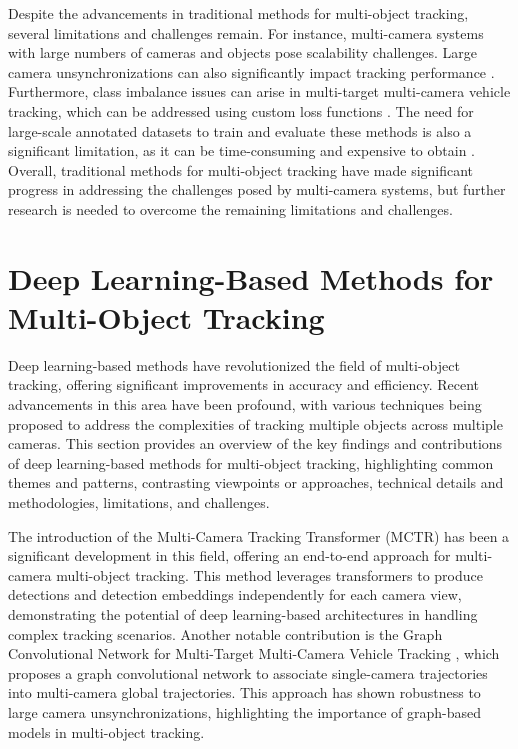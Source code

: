 \documentclass[conference]{IEEEtran}
\begin{document}
Despite the advancements in traditional methods for multi-object tracking, several limitations and challenges remain. For instance, multi-camera systems with large numbers of cameras and objects pose scalability challenges. Large camera unsynchronizations can also significantly impact tracking performance \cite{Title of paper 4}. Furthermore, class imbalance issues can arise in multi-target multi-camera vehicle tracking, which can be addressed using custom loss functions \cite{Title of paper 4}. The need for large-scale annotated datasets to train and evaluate these methods is also a significant limitation, as it can be time-consuming and expensive to obtain \cite{Title of paper 3} \cite{Title of paper 5}. Overall, traditional methods for multi-object tracking have made significant progress in addressing the challenges posed by multi-camera systems, but further research is needed to overcome the remaining limitations and challenges.

\section{Deep Learning-Based Methods for Multi-Object Tracking}
Deep learning-based methods have revolutionized the field of multi-object tracking, offering significant improvements in accuracy and efficiency. Recent advancements in this area have been profound, with various techniques being proposed to address the complexities of tracking multiple objects across multiple cameras. This section provides an overview of the key findings and contributions of deep learning-based methods for multi-object tracking, highlighting common themes and patterns, contrasting viewpoints or approaches, technical details and methodologies, limitations, and challenges.

The introduction of the Multi-Camera Tracking Transformer (MCTR) \cite{Title of MCTR paper} has been a significant development in this field, offering an end-to-end approach for multi-camera multi-object tracking. This method leverages transformers to produce detections and detection embeddings independently for each camera view, demonstrating the potential of deep learning-based architectures in handling complex tracking scenarios. Another notable contribution is the Graph Convolutional Network for Multi-Target Multi-Camera Vehicle Tracking \cite{Title of Graph Convolutional Network paper}, which proposes a graph convolutional network to associate single-camera trajectories into multi-camera global trajectories. This approach has shown robustness to large camera unsynchronizations, highlighting the importance of graph-based models in multi-object tracking.
\end{document}
